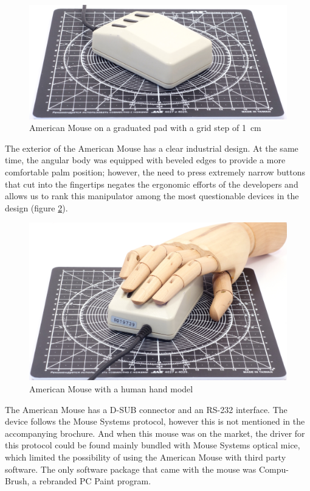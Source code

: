\documentclass[11pt, a4paper]{article}
\begin{document}
\begin{figure}[h]
    \centering
    \includegraphics[scale=0.5]{1986_american_mouse/size_30.jpg}
    \caption{American Mouse on a graduated pad with a grid step of 1~cm}
    \label{fig:AmericanSize}
\end{figure}

The exterior of the American Mouse has a clear industrial design. At the same time, the angular body was equipped with beveled edges to provide a more comfortable palm position; however, the need to press extremely narrow buttons that cut into the fingertips negates the ergonomic efforts of the developers and allows us to rank this manipulator among the most questionable devices in the design (figure \ref{fig:AmericanHand}).

\begin{figure}[h]
    \centering
    \includegraphics[scale=0.5]{1986_american_mouse/hand_30.jpg}
    \caption{American Mouse with a human hand model}
    \label{fig:AmericanHand}
\end{figure}

The American Mouse has a D-SUB connector and an RS-232 interface. The device follows the Mouse Systems protocol, however this is not mentioned in the accompanying brochure. And when this mouse was on the market, the driver for this protocol could be found mainly bundled with Mouse Systems optical mice, which limited the possibility of using the American Mouse with third party software. The only software package that came with the mouse was Compu-Brush, a rebranded PC Paint program.
\end{document}
